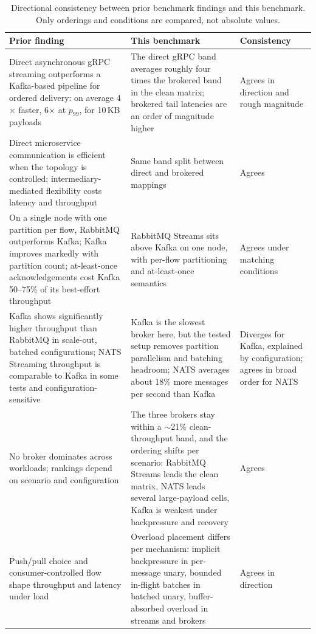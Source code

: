 \begin{table}[!htbp]
    \centering
    \scriptsize
    \caption{Directional consistency between prior benchmark findings and this benchmark. Only orderings and conditions are compared, not absolute values.}
    \label{tab:prior-consistency}
    \setlength{\tabcolsep}{4pt}
    \renewcommand{\arraystretch}{1.1}
    \begin{tabularx}{\textwidth}{>{\raggedright\arraybackslash}X>{\raggedright\arraybackslash}X>{\raggedright\arraybackslash}p{}}
        \toprule
        Prior finding & This benchmark & Consistency \\
        \midrule
        Direct asynchronous gRPC streaming outperforms a Kafka-based pipeline for ordered delivery: on average 4$\times$ faster, 6$\times$ at $p_{99}$, for 10\,KB payloads \cite{roohitavaf2019logplayer} & The direct gRPC band averages roughly four times the brokered band in the clean matrix; brokered tail latencies are an order of magnitude higher & Agrees in direction and rough magnitude \\
        Direct microservice communication is efficient when the topology is controlled; intermediary-mediated flexibility costs latency and throughput \cite{coviello2022dataxc} & Same band split between direct and brokered mappings & Agrees \\
        On a single node with one partition per flow, RabbitMQ outperforms Kafka; Kafka improves markedly with partition count; at-least-once acknowledgements cost Kafka 50--75\% of its best-effort throughput \cite{dobbelaere2017kafkarabbitmq} & RabbitMQ Streams sits above Kafka on one node, with per-flow partitioning and at-least-once semantics & Agrees under matching conditions \\
        Kafka shows significantly higher throughput than RabbitMQ in scale-out, batched configurations; NATS Streaming throughput is comparable to Kafka in some tests and configuration-sensitive \cite{sharvari2019messaging} & Kafka is the slowest broker here, but the tested setup removes partition parallelism and batching headroom; NATS averages about 18\% more messages per second than Kafka & Diverges for Kafka, explained by configuration; agrees in broad order for NATS \\
        No broker dominates across workloads; rankings depend on scenario and configuration \cite{ibrahim2026brokers,dobbelaere2017kafkarabbitmq} & The three brokers stay within a $\sim$21\% clean-throughput band, and the ordering shifts per scenario: RabbitMQ Streams leads the clean matrix, NATS leads several large-payload cells, Kafka is weakest under backpressure and recovery & Agrees \\
        Push/pull choice and consumer-controlled flow shape throughput and latency under load \cite{marcu2022pushpull,coviello2022dataxc} & Overload placement differs per mechanism: implicit backpressure in per-message unary, bounded in-flight batches in batched unary, buffer-absorbed overload in streams and brokers & Agrees in direction \\
        \bottomrule
    \end{tabularx}
\end{table}

